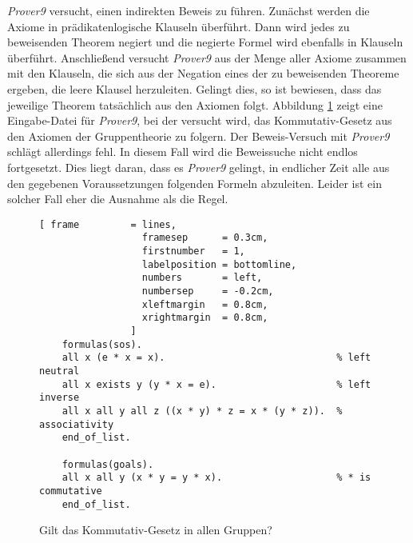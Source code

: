 \textsl{Prover9} versucht, einen indirekten Beweis zu führen.  Zunächst werden die Axiome in
prädikatenlogische Klauseln 
überführt. Dann wird jedes zu beweisenden Theorem negiert und die negierte Formel wird ebenfalls in 
Klauseln überführt.  Anschließend versucht \textsl{Prover9} aus der Menge aller Axiome zusammen mit den
Klauseln, die sich aus der Negation eines der zu beweisenden Theoreme ergeben, die leere
Klausel herzuleiten.  Gelingt dies, so ist bewiesen, dass das jeweilige  Theorem tatsächlich aus den Axiomen
folgt.   Abbildung \ref{fig:group-commutative.in} zeigt eine
Eingabe-Datei für \textsl{Prover9}, bei der versucht wird, das Kommutativ-Gesetz aus den Axiomen der
Gruppentheorie zu folgern.  Der Beweis-Versuch mit \textsl{Prover9} schlägt allerdings fehl.  In diesem Fall
wird die Beweissuche nicht endlos fortgesetzt.  Dies liegt daran, dass es \textsl{Prover9} gelingt, in
endlicher Zeit alle aus den gegebenen Voraussetzungen folgenden Formeln abzuleiten.
Leider ist ein solcher Fall eher die Ausnahme als die Regel.

\begin{figure}[!ht]
\centering
\begin{Verbatim}[ frame         = lines, 
                  framesep      = 0.3cm, 
                  firstnumber   = 1,
                  labelposition = bottomline,
                  numbers       = left,
                  numbersep     = -0.2cm,
                  xleftmargin   = 0.8cm,
                  xrightmargin  = 0.8cm,
                ]
    formulas(sos).
    all x (e * x = x).                              % left neutral 
    all x exists y (y * x = e).                     % left inverse
    all x all y all z ((x * y) * z = x * (y * z)).  % associativity
    end_of_list.
    
    formulas(goals).
    all x all y (x * y = y * x).                    % * is commutative
    end_of_list.
\end{Verbatim}
\vspace*{-0.3cm}
\caption{Gilt das Kommutativ-Gesetz in allen Gruppen?}
\label{fig:group-commutative.in}
\end{figure}


